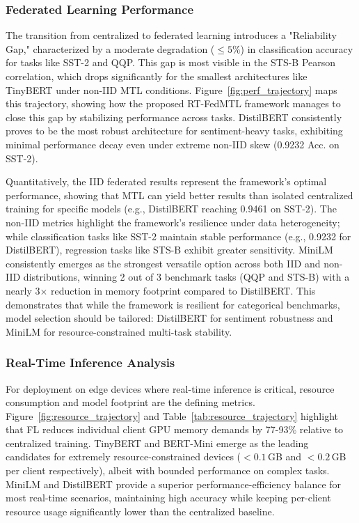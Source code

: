 \subsubsection{Federated Learning Performance}
The transition from centralized to federated learning introduces a "Reliability Gap," characterized by a moderate degradation (${\le}5\%$) in classification accuracy for tasks like SST-2 and QQP. This gap is most visible in the STS-B Pearson correlation, which drops significantly for the smallest architectures like TinyBERT under non-IID MTL conditions. Figure~\ref{fig:perf_trajectory} maps this trajectory, showing how the proposed RT-FedMTL framework manages to close this gap by stabilizing performance across tasks. DistilBERT consistently proves to be the most robust architecture for sentiment-heavy tasks, exhibiting minimal performance decay even under extreme non-IID skew (0.9232 Acc. on SST-2).

Quantitatively, the IID federated results represent the framework's optimal performance, showing that MTL can yield better results than isolated centralized training for specific models (e.g., DistilBERT reaching 0.9461 on SST-2). The non-IID metrics highlight the framework's resilience under data heterogeneity; while classification tasks like SST-2 maintain stable performance (e.g., 0.9232 for DistilBERT), regression tasks like STS-B exhibit greater sensitivity. MiniLM consistently emerges as the strongest versatile option across both IID and non-IID distributions, winning 2 out of 3 benchmark tasks (QQP and STS-B) with a nearly 3$\times$ reduction in memory footprint compared to DistilBERT. This demonstrates that while the framework is resilient for categorical benchmarks, model selection should be tailored: DistilBERT for sentiment robustness and MiniLM for resource-constrained multi-task stability.











\subsubsection{Real-Time Inference Analysis}
For deployment on edge devices where real-time inference is critical, resource consumption and model footprint are the defining metrics. Figure~\ref{fig:resource_trajectory} and Table~\ref{tab:resource_trajectory} highlight that FL reduces individual client GPU memory demands by 77-93\% relative to centralized training. TinyBERT and BERT-Mini emerge as the leading candidates for extremely resource-constrained devices ($<0.1$\,GB and $<0.2$\,GB per client respectively), albeit with bounded performance on complex tasks. MiniLM and DistilBERT provide a superior performance-efficiency balance for most real-time scenarios, maintaining high accuracy while keeping per-client resource usage significantly lower than the centralized baseline.






